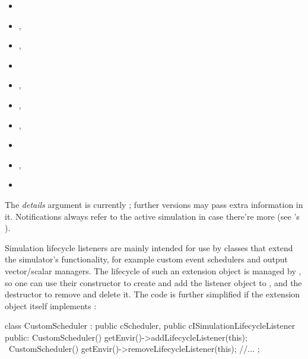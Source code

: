 \begin{itemize}[noitemsep]
  \item {}
  \item {}, 
  \item {}, 
  \item {}
  \item {}, 
  \item {}, 
  \item {}, 
  \item {}
  \item {}, 
  \item {}
\end{itemize}

The \textit{details} argument is currently ; further {\opp}
versions may pass extra information in it. Notifications always refer to
the active simulation in case there're more (see 's
).

Simulation lifecycle listeners are mainly intended for use by classes that
extend the simulator's functionality, for example custom event schedulers
and output vector/scalar managers. The lifecycle of such an extension
object is managed by {\opp}, so one can use their constructor to create and
add the listener object to , and the destructor to remove
and delete it. The code is further simplified if the extension object
itself implements :


\begin{cpp}
class CustomScheduler : public cScheduler, public cISimulationLifecycleListener
{
  public:
    CustomScheduler() { getEnvir()->addLifecycleListener(this); }
    ~CustomScheduler() { getEnvir()->removeLifecycleListener(this); }
    //...
};
\end{cpp}


